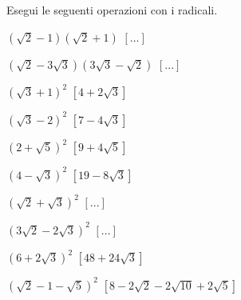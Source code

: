 \begin{esercizio}
\label{ese:2.55}
Esegui le seguenti operazioni con i radicali.
\begin{htmulticols}{2}
\begin{enumeratea}
\item \((\sqrt 2-1)(\sqrt 2+1)\)
\hfill \(\left[...\right]\)
\item \((\sqrt 2-3\sqrt 3)(3\sqrt 3-\sqrt 2)\)
\hfill \(\left[...\right]\)
\item \((\sqrt 3+1)^2\)
\hfill \(\left[4+2\sqrt 3\right]\)
\item \((\sqrt 3-2)^2\)
\hfill \(\left[7-4\sqrt 3\right]\)
\item \((2+\sqrt 5)^2\)
\hfill \(\left[9+4\sqrt 5\right]\)
\item \((4-\sqrt 3)^2\)
\hfill \(\left[19-8\sqrt 3\right]\)
\item \((\sqrt 2+\sqrt 3)^2\)
\hfill \(\left[...\right]\)
\item \((3\sqrt 2-2\sqrt 3)^2\)
\hfill \(\left[...\right]\)
\item \((6+2\sqrt 3)^2\)
\hfill \(\left[48+24\sqrt 3\right]\)
\item \((\sqrt 2-1-\sqrt 5)^2\)
\hfill \(\left[8-2\sqrt 2-2\sqrt{10}+2\sqrt 5\right]\)

\end{enumeratea}
\end{htmulticols}
\end{esercizio}
